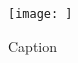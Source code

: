 \begin{figure}
    \centering
    \texttt{[image: ]}
    \caption{Caption}
    \label{fig:enter-label}
\end{figure}